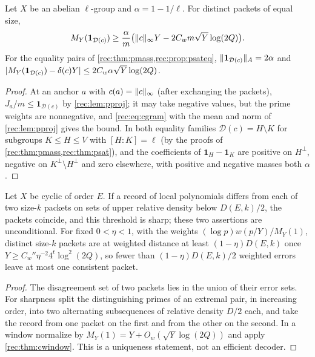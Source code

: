 \begin{proposition}\label{rec:prop:pwindow}
Let $X$ be an abelian $\ell$-group and $\alpha=1-1/\ell$. For distinct packets of equal size,
\[
 M_Y(\mathbf 1_{\mathcal D(c)})\ge\frac\alpha m\bigl(\lVert c\rVert_\infty Y-2C_wm\sqrt Y\log(2Q)\bigr).
\]
For the equality pairs of \cref{rec:thm:pmass,rec:prop:psateq}, $\lVert\mathbf 1_{\mathcal D(c)}\rVert_A=2\alpha$ and
$\lvert M_Y(\mathbf 1_{\mathcal D(c)})-\delta(c)Y\rvert\le2C_w\alpha\sqrt Y\log(2Q)$.
\end{proposition}

\begin{proof}
At an anchor $a$ with $c(a)=\lVert c\rVert_\infty$ (after exchanging the packets), $J_a/m\le\mathbf 1_{\mathcal D(c)}$ by \cref{rec:lem:pproj}; it
may take negative values, but the prime weights are nonnegative, and \eqref{rec:eq:cgram} with the mean and norm
of \cref{rec:lem:pproj} gives the bound. In both equality families $\mathcal D(c)=H\setminus K$ for subgroups $K\le H\le V$ with
$[H:K]=\ell$ (by the proofs of \cref{rec:thm:pmass,rec:thm:psat}), and the coefficients of $\mathbf 1_H-\mathbf 1_K$ are positive on $H^\perp$,
negative on $K^\perp\setminus H^\perp$ and zero elsewhere, with positive and negative masses both $\alpha$.
\end{proof}

\begin{corollary}\label{rec:cor:ccorrect}
Let $X$ be cyclic of order $E$. If a record of local polynomials differs from each of two size-$k$ packets on
sets of upper relative density below $D(E,k)/2$, the packets coincide, and this threshold is sharp; these two
assertions are unconditional. For fixed $0<\eta<1$, with the weights $(\log p)w(p/Y)/M_Y(1)$, distinct size-$k$
packets are at weighted distance at least $(1-\eta)D(E,k)$ once $Y\ge C_w''\eta^{-2}4^t\log^2(2Q)$, so fewer than $(1-\eta)D(E,k)/2$
weighted errors leave at most one consistent packet.
\end{corollary}

\begin{proof}
The disagreement set of two packets lies in the union of their error sets. For sharpness split the
distinguishing primes of an extremal pair, in increasing order, into two alternating subsequences of
relative density $D/2$ each, and take the record from one packet on the first and from the other on the
second. In a window normalize by $M_Y(1)=Y+O_w(\sqrt Y\log(2Q))$ and apply \cref{rec:thm:cwindow}. This is a uniqueness
statement, not an efficient decoder.
\end{proof}

